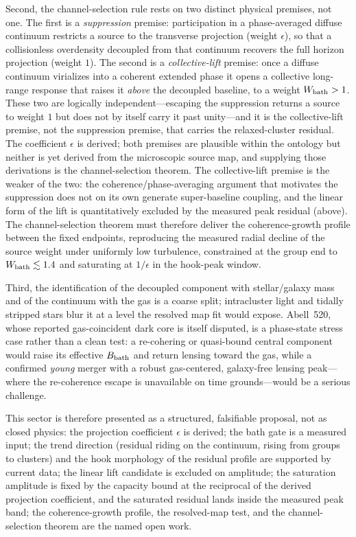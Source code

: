 \documentclass[11pt]{article}
\begin{document}
Second, the channel-selection rule rests on two distinct physical premises, not one. The first is a \emph{suppression} premise: participation in a phase-averaged diffuse continuum restricts a source to the transverse projection (weight $\epsilon$), so that a collisionless overdensity decoupled from that continuum recovers the full horizon projection (weight $1$). The second is a \emph{collective-lift} premise: once a diffuse continuum virializes into a coherent extended phase it opens a collective long-range response that raises it \emph{above} the decoupled baseline, to a weight $W_{\rm bath}>1$. These two are logically independent---escaping the suppression returns a source to weight $1$ but does not by itself carry it past unity---and it is the collective-lift premise, not the suppression premise, that carries the relaxed-cluster residual. The coefficient $\epsilon$ is derived; both premises are plausible within the ontology but neither is yet derived from the microscopic source map, and supplying those derivations is the channel-selection theorem. The collective-lift premise is the weaker of the two: the coherence/phase-averaging argument that motivates the suppression does not on its own generate super-baseline coupling, and the linear form of the lift is quantitatively excluded by the measured peak residual (above). The channel-selection theorem must therefore deliver the coherence-growth profile between the fixed endpoints, reproducing the measured radial decline of the source weight under uniformly low turbulence, constrained at the group end to $W_{\rm bath}\lesssim1.4$ and saturating at $1/\epsilon$ in the hook-peak window.

Third, the identification of the decoupled component with stellar/galaxy mass and of the continuum with the gas is a coarse split; intracluster light and tidally stripped stars blur it at a level the resolved map fit would expose. Abell~520, whose reported gas-coincident dark core is itself disputed, is a phase-state stress case rather than a clean test: a re-cohering or quasi-bound central component would raise its effective $B_{\rm bath}$ and return lensing toward the gas, while a confirmed \emph{young} merger with a robust gas-centered, galaxy-free lensing peak---where the re-coherence escape is unavailable on time grounds---would be a serious challenge.

This sector is therefore presented as a structured, falsifiable proposal, not as closed physics: the projection coefficient $\epsilon$ is derived; the bath gate is a measured input; the trend direction (residual riding on the continuum, rising from groups to clusters) and the hook morphology of the residual profile are supported by current data; the linear lift candidate is excluded on amplitude; the saturation amplitude is fixed by the capacity bound at the reciprocal of the derived projection coefficient, and the saturated residual lands inside the measured peak band; the coherence-growth profile, the resolved-map test, and the channel-selection theorem are the named open work.
\end{document}
